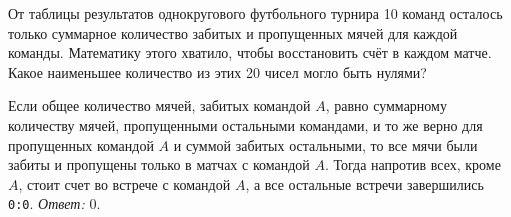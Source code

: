 От таблицы результатов однокругового футбольного турнира 10 команд осталось
только суммарное количество забитых и пропущенных мячей для каждой команды.
Математику этого хватило, чтобы восстановить счёт в каждом матче.
Какое наименьшее количество из этих 20 чисел могло быть нулями?

\solution
Если общее количество мячей, забитых командой $A$, равно суммарному количеству
мячей, пропущенными остальными командами, и то же верно для пропущенных
командой $A$ и суммой забитых остальными, то все мячи были забиты и пропущены
только в матчах с командой $A$.
Тогда напротив всех, кроме $A$, стоит счет во встрече с командой $A$, а все
остальные встречи завершились \texttt{0:0}.
\emph{Ответ:} 0.

